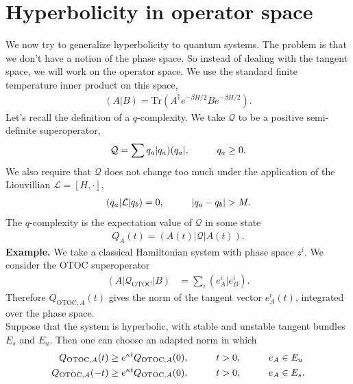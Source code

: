 \documentclass[JHEP,12pt]{article}
\begin{document}
\section{Hyperbolicity in operator space}
We now try to generalize hyperbolicity to quantum systems. The problem is that we don't have a notion of the phase space. So instead of dealing with the tangent space, we will work on the operator space. We use the standard finite temperature inner product on this space, 
\begin{align}
(A|B)=\text{Tr}(A^\dagger e^{-\beta H/2}Be^{-\beta H/2}).
\end{align}
\indent Let's recall the definition of a $q$-complexity. We take $\mathcal{Q}$ to be a positive semi-definite superoperator,
\begin{align}
\mathcal{Q}=\sum q_a|q_a)(q_a|,\hspace{10 mm}q_a\ge 0.
\end{align}
We also require that $\mathcal{Q}$ does not change too much under the application of the Liouvillian $\mathcal{L}=[H,\cdot]$, 
\begin{align}
(q_a|\mathcal{L}|q_b)=0,\hspace{10 mm}|q_a-q_b|>M.
\end{align}
The $q$-complexity is the expectation value of $\mathcal{Q}$ in some state 
\begin{align}
Q_A(t)=(A(t)|\mathcal{Q}|A(t)).
\end{align}
\textbf{Example.} We take a classical Hamiltonian system with phase space $z^i$. We consider the OTOC superoperator 
\begin{align}
(A|\mathcal{Q}_{\text{OTOC}}|B)&=\sum_i (e_A^i|e_B^i).
\end{align}
Therefore $Q_{\text{OTOC},A}(t)$ gives the norm of the tangent vector $e_A^i(t)$, integrated over the phase space. \\
\indent Suppose that the system is hyperbolic, with stable and unstable tangent bundles $E_s$ and $E_u$. Then one can choose an adapted norm in which 
\begin{align}
Q_{\text{OTOC},A}(t)&\ge e^{\kappa t}Q_{\text{OTOC},A}(0),\hspace{10 mm}t>0,\hspace{10 mm}e_A\in E_{u}\\
Q_{\text{OTOC},A}(-t)&\ge e^{\kappa t}Q_{\text{OTOC},A}(0),\hspace{10 mm}t>0,\hspace{10 mm}e_A\in E_s.
\end{align}
\end{document}
